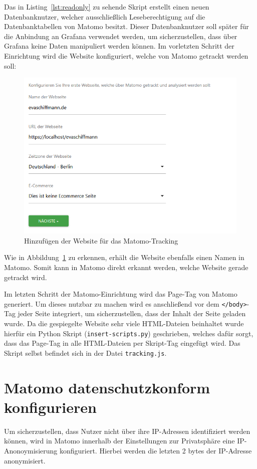 Das in Listing~\ref{lst:readonly} zu sehende Skript erstellt einen neuen Datenbanknutzer, welcher ausschließlich Leseberechtigung auf die Datenbanktabellen von Matomo besitzt. Dieser Datenbanknutzer soll später für die Anbindung an Grafana verwendet werden, um sicherzustellen, dass über Grafana keine Daten manipuliert werden können. Im vorletzten Schritt der Einrichtung wird die Website konfiguriert, welche von Matomo getrackt werden soll: 

\begin{figure}[H]
    \centering
    \includegraphics[width=\textwidth, keepaspectratio]{images/website-hinzufuegen.png}
    \caption{Hinzufügen der Website für das Matomo-Tracking}
    \label{fig:website-hinzufuegen}
\end{figure}

Wie in Abbildung~\ref{fig:website-hinzufuegen} zu erkennen, erhält die Website ebenfalls einen Namen in Matomo. Somit kann in Matomo direkt erkannt werden, welche Website gerade getrackt wird. 

Im letzten Schritt der Matomo-Einrichtung wird das Page-Tag von Matomo generiert. Um dieses nutzbar zu machen wird es anschließend vor dem \texttt{</body>}-Tag jeder Seite integriert, um sicherzustellen, dass der Inhalt der Seite geladen wurde. Da die gespiegelte Website sehr viele HTML-Dateien beinhaltet wurde hierfür ein Python Skript (\texttt{insert-scripts.py}) geschrieben, welches dafür sorgt, dass das Page-Tag in alle HTML-Dateien per Skript-Tag eingefügt wird. Das Skript selbst befindet sich in der Datei \texttt{tracking.js}. 


\section{Matomo datenschutzkonform konfigurieren}
Um sicherzustellen, dass Nutzer nicht über ihre IP-Adressen identifiziert werden können, wird in Matomo innerhalb der Einstellungen zur Privatsphäre eine IP-Anonoymisierung konfiguriert. Hierbei werden die letzten 2 bytes der IP-Adresse anonymisiert. 

